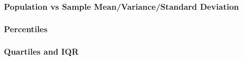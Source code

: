 \documentclass[handout]{beamer}
\newcommand{\blue}[1]{\textcolor{blue2}{#1}}
\begin{document}
\begin{frame}[fragile]
\frametitle{Population vs Sample Mean/Variance/Standard Deviation}

%

\end{frame}


\begin{frame}
\frametitle{Percentiles}
%
%
%
%

\end{frame}


\begin{frame}
\frametitle{Quartiles and IQR}

%
%
%
%
%
%

\end{frame}
\end{document}
